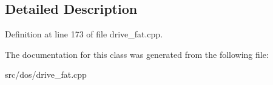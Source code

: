 \subsection{Detailed Description}


Definition at line 173 of file drive\-\_\-fat.\-cpp.



The documentation for this class was generated from the following file\-:\begin{DoxyCompactItemize}
\item 
src/dos/drive\-\_\-fat.\-cpp\end{DoxyCompactItemize}
